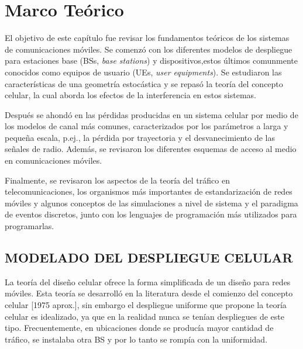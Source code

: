 
\chapter{Marco Teórico} %

\label{Chapter2} 

El objetivo de este capítulo fue revisar los fundamentos teóricos de los sistemas de comunicaciones móviles. Se comenzó con los diferentes modelos de despliegue para estaciones base (BSs, \textit{base stations}) y dispositivos,estos últimos comunmente conocidos como equipos de usuario (UEs, \textit{user equipments}). Se estudiaron las características de una geometría estocástica y se repasó la teoría del concepto celular, la cual aborda los efectos de la interferencia en estos sistemas.\newline

Después se ahondó en las pérdidas producidas en un sistema celular por medio de los modelos de canal más comunes, caracterizados por los parámetros a larga y pequeña escala, p.ej., la pérdida por trayectoria y el desvanecimiento de las señales de radio. Además, se revisaron los diferentes esquemas de acceso al medio en comunicaciones móviles.\newline

Finalmente, se revisaron los aspectos de la teoría del tráfico en telecomunicaciones, los organismos más importantes de estandarización de redes móviles y algunos conceptos de las simulaciones a nivel de sistema y el paradigma de eventos discretos, junto con los lenguajes de programación más utilizados para programarlas.\newline



\section{MODELADO DEL DESPLIEGUE CELULAR}

La teoría del diseño celular ofrece la forma simplificada de un diseño para redes móviles. Esta teoría se desarrolló en la literatura desde el comienzo del concepto celular [1975 aprox.], sin embargo el despliegue uniforme que propone la teoría celular es idealizado, ya que en la realidad nunca se tenían despliegues de este tipo. Frecuentemente, en ubicaciones donde se producía mayor cantidad de tráfico, se instalaba otra BS y por lo tanto se rompía con la uniformidad.\newline

